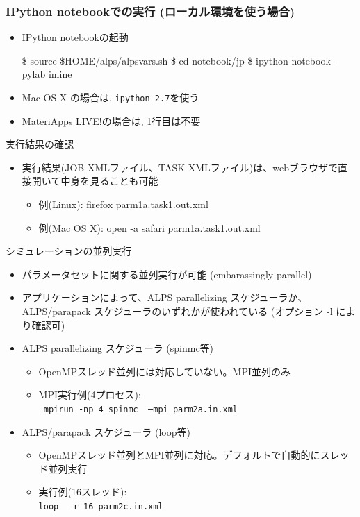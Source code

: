 \begin{frame}[fragile,c]
  \frametitle{IPython notebookでの実行 (ローカル環境を使う場合)}
  \begin{itemize}
    \setlength{\itemsep}{1em}
  \item IPython notebookの起動
\begin{semiverbatim}
\$ source \$HOME/alps/alpsvars.sh
\$ cd notebook/jp
\$ ipython notebook --pylab inline
\end{semiverbatim}
  \item Mac OS X の場合は, {\tt ipython-2.7}を使う
  \item MateriApps LIVE!の場合は, 1行目は不要
  \end{itemize}
\end{frame}

\begin{frame}{実行結果の確認}
  \begin{itemize}
    \item 実行結果(JOB XMLファイル、TASK XMLファイル)は、webブラウザで直接開いて中身を見ることも可能
      \begin{itemize}
      \item 例(Linux): firefox parm1a.task1.out.xml
      \item 例(Mac OS X): open -a safari parm1a.task1.out.xml
      \end{itemize}
  \end{itemize}
\end{frame}

\begin{frame}{シミュレーションの並列実行}
  \begin{itemize}
    \item パラメータセットに関する並列実行が可能 (embarassingly parallel)
    \item アプリケーションによって、ALPS parallelizing スケジューラか、ALPS/parapack スケジューラのいずれかが使われている (オプション -l により確認可)
    \item ALPS parallelizing スケジューラ (spinmc等)
      \begin{itemize}
        \item OpenMPスレッド並列には対応していない。MPI並列のみ
        \item MPI実行例(4プロセス): \\ {\tt {\color{red} mpirun -np 4} spinmc {\color{red} --mpi} parm2a.in.xml}
      \end{itemize}
    \item ALPS/parapack スケジューラ (loop等)
      \begin{itemize}
        \item OpenMPスレッド並列とMPI並列に対応。デフォルトで自動的にスレッド並列実行
        \item 実行例(16スレッド): \\ {\tt loop {\color{red} -r 16} parm2c.in.xml}
      \end{itemize}
  \end{itemize}
\end{frame}

